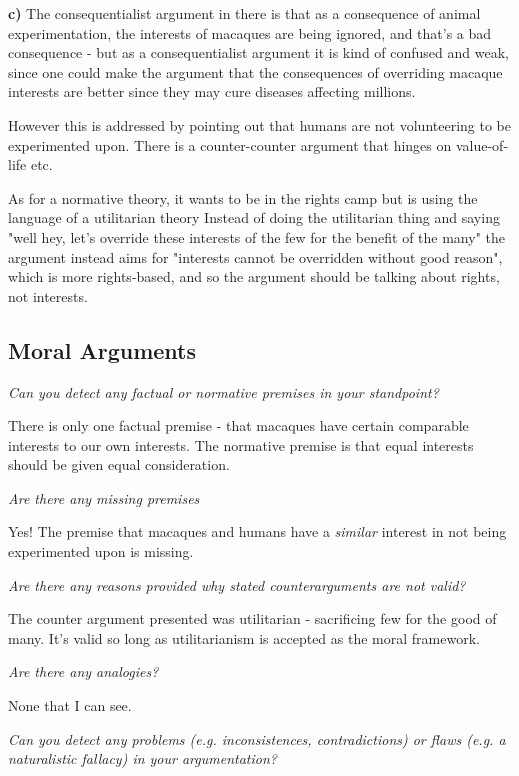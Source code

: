 \documentclass{article}
\begin{document}
			\textbf{c)} The consequentialist argument in there is that as a consequence of animal experimentation, the interests of macaques are being ignored, and that's a bad consequence - but as a consequentialist argument it is kind of confused and weak, since one could make the argument that the consequences of overriding macaque interests are better since they may cure diseases affecting millions.
			
			However this is addressed by pointing out that humans are not volunteering to be experimented upon. There is a counter-counter argument that hinges on value-of-life etc.
			
			As for a normative theory, it wants to be in the rights camp but is using the language of a utilitarian theory Instead of doing the utilitarian thing and saying "well hey, let's override these interests of the few for the benefit of the many" the argument instead aims for "interests cannot be overridden without good reason", which is more rights-based, and so the argument should be talking about rights, not interests.
			
		\subsection{Moral Arguments}
			
			\textit{Can you detect any factual or normative premises in your standpoint?}
		
			There is only one factual premise - that macaques have certain comparable interests to our own interests. The normative premise is that equal interests should be given equal consideration.
			
			\textit{Are there any missing premises}		
			
			Yes! The premise that macaques and humans have a \textit{similar} interest in not being experimented upon is missing. 
			
			\textit{Are there any reasons provided why stated counterarguments are not valid?}
			
			The counter argument presented was utilitarian - sacrificing few for the good of many. It's valid so long as utilitarianism is accepted as the moral framework.
			
			\textit{Are there any analogies? }
			
			None that I can see.
			
			\textit{Can you detect any problems (e.g. inconsistences, contradictions) or flaws (e.g. a naturalistic
fallacy) in your argumentation? }
\end{document}
